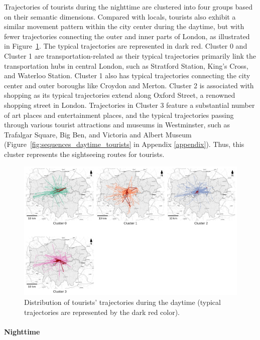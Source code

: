 \documentclass{article}
\newcommand{\subsubsubsection}[1]{\paragraph{#1}\mbox{}\\}
\theoremstyle{remark}
\begin{document}
Trajectories of tourists during the nighttime are clustered into four groups based on their semantic dimensions. Compared with locals, tourists also exhibit a similar movement pattern within the city center during the daytime, but with fewer trajectories connecting the outer and inner parts of London, as illustrated in Figure~\ref{fig:traj_distribution_daytime_tourists}. The typical trajectories are represented in dark red. Cluster 0 and Cluster 1 are transportation-related as their typical trajectories primarily link the transportation hubs in central London, such as Stratford Station, King's Cross, and Waterloo Station. Cluster 1 also has typical trajectories connecting the city center and outer boroughs like Croydon and Merton. Cluster 2 is associated with shopping as its typical trajectories extend along Oxford Street, a renowned shopping street in London. Trajectories in Cluster 3 feature a substantial number of art places and entertainment places, and the typical trajectories passing through various tourist attractions and museums in Westminster, such as Trafalgar Square, Big Ben, and Victoria and Albert Museum (Figure~\ref{fig:sequences_daytime_tourists} in Appendix \ref{appendix}). Thus, this cluster represents the sightseeing routes for tourists.


\begin{figure}[!h]
\centering
\includegraphics[width=1\textwidth]{figures/traj_distribution_daytime_tourists.png}
\caption{\label{fig:traj_distribution_daytime_tourists}Distribution of tourists' trajectories during the daytime (typical trajectories are represented by the dark red color).}
\end{figure}



\subsubsubsection{Nighttime}
\end{document}
